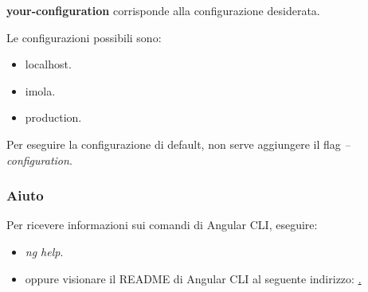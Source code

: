 \documentclass[../manuale-manutentore.tex]{subfiles}
\begin{document}
\textbf{your-configuration} corrisponde alla configurazione desiderata.

Le configurazioni possibili sono:
\begin{itemize}
  \item localhost.
  \item imola.
  \item production.
\end{itemize}

Per eseguire la configurazione di default, non serve aggiungere il flag \textit{--configuration}.

\subsubsection{Aiuto}%
\label{subs:aiuto}

Per ricevere informazioni sui comandi di Angular CLI, eseguire:
\begin{itemize}
  \item \textit{ng help}.
  \item oppure visionare il README di Angular CLI al seguente indirizzo: \href{https://github.com/angular/angular-cli/blob/master/README.md}.
\end{itemize}
\end{document}
